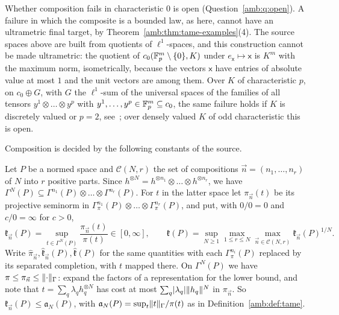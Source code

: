 \begin{remark}[scope]\label{amb:rem:scope}
Whether composition fails in characteristic $0$ is open (Question~\ref{amb:q:open}). A failure in which the composite is a bounded law, as here, cannot have an ultrametric final target, by Theorem~\ref{amb:thm:tame-examples}(4). The source spaces above are built from quotients of $\ell^1$-spaces, and this construction cannot be made ultrametric: the quotient of $c_0(\mathbb F_p^m\setminus\{0\},K)$ under $e_{\mathsf x}\mapsto\mathsf x$ is $K^m$ with the maximum norm, isometrically, because the vectors $\mathsf x$ have entries of absolute value at most $1$ and the unit vectors are among them. Over $K$ of characteristic $p$, on $c_0\oplus G$, with $G$ the $\ell^1$-sum of the universal spaces of the families of all tensors $y^1\otimes\dots\otimes y^p$ with $y^1,\dots,y^p\in\mathbb F_p^m\subseteq c_0$, the same failure holds if $K$ is discretely valued or $p=2$, see~\cite{II}; over densely valued $K$ of odd characteristic this is open.
\end{remark}

Composition is decided by the following constants of the source.

\begin{definition}\label{amb:def:constants}
Let $P$ be a normed space and $\mathcal C(N,r)$ the set of compositions $\vec n=(n_1,\dots,n_r)$ of $N$ into $r$ positive parts. Since $h^{\otimes N}=h^{\otimes n_1}\otimes\dots\otimes h^{\otimes n_r}$, we have $\Gamma^N(P)\subseteq\Gamma^{n_1}(P)\otimes\dots\otimes\Gamma^{n_r}(P)$. For $t$ in the latter space let $\pi_{\vec n}(t)$ be its projective seminorm in $\Gamma^{n_1}_\pi(P)\otimes\dots\otimes\Gamma^{n_r}_\pi(P)$, and put, with $0/0=0$ and $c/0=\infty$ for $c>0$,
\[
 \mathfrak k_{\vec n}(P)=\sup_{t\in\Gamma^N(P)}\frac{\pi_{\vec n}(t)}{\pi(t)}\in[0,\infty],\qquad
 \mathfrak k(P)=\sup_{N\ge1}\max_{1\le r\le N}\max_{\vec n\in\mathcal C(N,r)}\mathfrak k_{\vec n}(P)^{1/N}.
\]
Write $\widehat\pi_{\vec n},\widehat{\mathfrak k}_{\vec n}(P),\widehat{\mathfrak k}(P)$ for the same quantities with each $\Gamma^{n_i}_\pi(P)$ replaced by its separated completion, with $t$ mapped there. On $\Gamma^N(P)$ we have $\pi\le\pi_{\vec n}\le\lVert \cdot\rVert_\Gamma$: expand the factors of a representation for the lower bound, and note that $t=\sum_q\lambda_qh_q^{\otimes N}$ has cost at most $\sum_q\lvert \lambda_q\rvert\lVert h_q\rVert^N$ in $\pi_{\vec n}$. So $\mathfrak k_{\vec n}(P)\le\mathfrak a_N(P)$, with $\mathfrak a_N(P)=\sup_t\lVert t\rVert_\Gamma/\pi(t)$ as in Definition~\ref{amb:def:tame}.
\end{definition}

